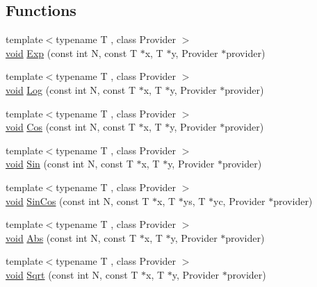 \subsection*{Functions}
\begin{DoxyCompactItemize}
\item 
{\footnotesize template$<$typename T , class Provider $>$ }\\\mbox{\hyperlink{mlasi_8h_a88f941d423cb2a819b70a1358982b1a6}{void}} \mbox{\hyperlink{namespaceonnxruntime_1_1math_ae77fccf2943859c29b77038e543a0801}{Exp}} (const int N, const T $\ast$x, T $\ast$y, Provider $\ast$provider)
\item 
{\footnotesize template$<$typename T , class Provider $>$ }\\\mbox{\hyperlink{mlasi_8h_a88f941d423cb2a819b70a1358982b1a6}{void}} \mbox{\hyperlink{namespaceonnxruntime_1_1math_a4ef818f7b843cea1431240a6751d01a0}{Log}} (const int N, const T $\ast$x, T $\ast$y, Provider $\ast$provider)
\item 
{\footnotesize template$<$typename T , class Provider $>$ }\\\mbox{\hyperlink{mlasi_8h_a88f941d423cb2a819b70a1358982b1a6}{void}} \mbox{\hyperlink{namespaceonnxruntime_1_1math_ae3632e34fdb6454d363da7e14c8f3ef1}{Cos}} (const int N, const T $\ast$x, T $\ast$y, Provider $\ast$provider)
\item 
{\footnotesize template$<$typename T , class Provider $>$ }\\\mbox{\hyperlink{mlasi_8h_a88f941d423cb2a819b70a1358982b1a6}{void}} \mbox{\hyperlink{namespaceonnxruntime_1_1math_a0ad494b8508b830475ad78be7a089f27}{Sin}} (const int N, const T $\ast$x, T $\ast$y, Provider $\ast$provider)
\item 
{\footnotesize template$<$typename T , class Provider $>$ }\\\mbox{\hyperlink{mlasi_8h_a88f941d423cb2a819b70a1358982b1a6}{void}} \mbox{\hyperlink{namespaceonnxruntime_1_1math_a9e5f38ab268b24fa5920761852a22b12}{Sin\+Cos}} (const int N, const T $\ast$x, T $\ast$ys, T $\ast$yc, Provider $\ast$provider)
\item 
{\footnotesize template$<$typename T , class Provider $>$ }\\\mbox{\hyperlink{mlasi_8h_a88f941d423cb2a819b70a1358982b1a6}{void}} \mbox{\hyperlink{namespaceonnxruntime_1_1math_a8988cb42d57c2365657e6a803b16ec7d}{Abs}} (const int N, const T $\ast$x, T $\ast$y, Provider $\ast$provider)
\item 
{\footnotesize template$<$typename T , class Provider $>$ }\\\mbox{\hyperlink{mlasi_8h_a88f941d423cb2a819b70a1358982b1a6}{void}} \mbox{\hyperlink{namespaceonnxruntime_1_1math_abadd1cdbc69d0aed1bf8a188dac24759}{Sqrt}} (const int N, const T $\ast$x, T $\ast$y, Provider $\ast$provider)

\end{DoxyCompactItemize}
